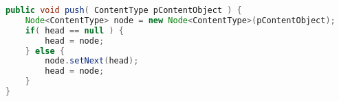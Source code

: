\begin{lstlisting}[language=Java]
public void push( ContentType pContentObject ) {
	Node<ContentType> node = new Node<ContentType>(pContentObject);
	if( head == null ) {
		head = node;
	} else {
		node.setNext(head);
		head = node;
	}
}
\end{lstlisting}

